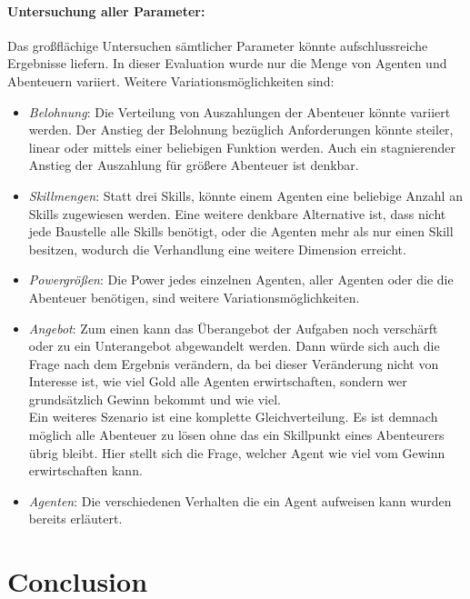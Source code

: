 \documentclass[fleqn,10pt]{SelfArx} %
\begin{document}
\paragraph{Untersuchung aller Parameter:}
Das großflächige Untersuchen sämtlicher Parameter könnte aufschlussreiche Ergebnisse liefern. In dieser Evaluation wurde nur die Menge von Agenten und Abenteuern variiert. Weitere Variationsmöglichkeiten sind:
\begin{itemize}
	\item \textit{Belohnung}: Die Verteilung von Auszahlungen der Abenteuer könnte variiert werden. Der Anstieg der Belohnung bezüglich Anforderungen könnte steiler, linear oder mittels einer beliebigen Funktion werden. Auch ein stagnierender Anstieg der Auszahlung für größere Abenteuer ist denkbar.
	\item \textit{Skillmengen}: Statt drei Skills, könnte einem Agenten eine beliebige Anzahl an Skills zugewiesen werden. Eine weitere denkbare Alternative ist, dass nicht jede Baustelle alle Skills benötigt, oder die Agenten mehr als nur einen Skill besitzen, wodurch die Verhandlung eine weitere Dimension erreicht. 
	\item \textit{Powergrößen}: Die Power jedes einzelnen Agenten, aller Agenten oder die die Abenteuer benötigen, sind weitere Variationsmöglichkeiten.
	\item \textit{Angebot}: Zum einen kann das Überangebot der Aufgaben noch verschärft oder zu ein Unterangebot abgewandelt werden. Dann würde sich auch die Frage nach dem Ergebnis verändern, da bei dieser Veränderung nicht von Interesse ist, wie viel Gold alle Agenten erwirtschaften, sondern wer grundsätzlich Gewinn bekommt und wie viel. \\
	Ein weiteres Szenario ist eine komplette Gleichverteilung. Es ist demnach möglich alle Abenteuer zu lösen ohne das ein Skillpunkt eines Abenteurers übrig bleibt. Hier stellt sich die Frage, welcher Agent wie viel vom Gewinn erwirtschaften kann.
	\item \textit{Agenten}: Die verschiedenen Verhalten die ein Agent aufweisen kann wurden bereits erläutert.
\end{itemize}




\section{Conclusion}
\label{sec:Conclusion}






\end{document}
